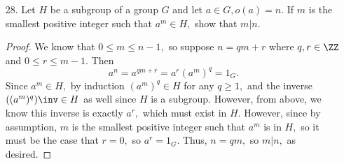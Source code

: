 \documentclass{article}
\begin{document}
\begin{itemize}
\begin{enumerate}[(a)]
\begin{soln}
				\end{soln}
				
		\end{enumerate}

	\item[28.] Let $H$ be a subgroup of a group $G$ and let $a\in G, o(a)=n.$ If $m$ is the smallest positive integer such that $a^m\in H,$ show that $m|n.$
		\begin{proof}
			We know that $0\le m\le n-1,$ so suppose $n=qm+r$ where $q, r\in\ZZ$ and $0\le r\le m-1.$ Then \[a^n=a^{qm+r}=a^r(a^m)^q=1_G.\] Since $a^m\in H,$ by induction $(a^m)^q\in H$ for any $q\ge 1,$ and the inverse $((a^m)^q)\inv\in H$ as well since $H$ is a subgroup. However, from above, we know this inverse is exactly $a^r,$ which must exist in $H.$ However, since by assumption, $m$ is the smallest positive integer such that $a^m$ is in $H,$ so it must be the case that $r=0,$ so $a^r=1_G.$ Thus, $n=qm,$ so $m|n,$ as desired.
			
		\end{proof}
		
\end{itemize}
\end{document}
